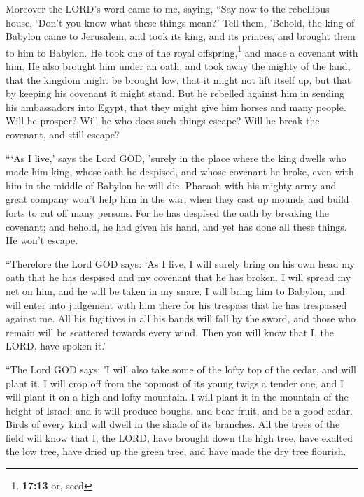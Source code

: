  Moreover the LORD's word came to me, saying,
 ``Say now to the rebellious house, `Don't you know what
these things mean?' Tell them, 'Behold, the king of Babylon came to
Jerusalem, and took its king, and its princes, and brought them to him
to Babylon.  He took one of the royal
offspring,\footnote{\textbf{17:13} or, seed} and made a covenant with
him. He also brought him under an oath, and took away the mighty of the
land,  that the kingdom might be brought low, that it
might not lift itself up, but that by keeping his covenant it might
stand.  But he rebelled against him in sending his
ambassadors into Egypt, that they might give him horses and many people.
Will he prosper? Will he who does such things escape? Will he break the
covenant, and still escape?

 ```As I live,' says the Lord GOD, 'surely in the place
where the king dwells who made him king, whose oath he despised, and
whose covenant he broke, even with him in the middle of Babylon he will
die.  Pharaoh with his mighty army and great company
won't help him in the war, when they cast up mounds and build forts to
cut off many persons.  For he has despised the oath by
breaking the covenant; and behold, he had given his hand, and yet has
done all these things. He won't escape.

 ``Therefore the Lord GOD says: `As I live, I will surely
bring on his own head my oath that he has despised and my covenant that
he has broken.  I will spread my net on him, and he will
be taken in my snare. I will bring him to Babylon, and will enter into
judgement with him there for his trespass that he has trespassed against
me.  All his fugitives in all his bands will fall by the
sword, and those who remain will be scattered towards every wind. Then
you will know that I, the LORD, have spoken it.'

 ``The Lord GOD says: 'I will also take some of the lofty
top of the cedar, and will plant it. I will crop off from the topmost of
its young twigs a tender one, and I will plant it on a high and lofty
mountain.  I will plant it in the mountain of the height
of Israel; and it will produce boughs, and bear fruit, and be a good
cedar. Birds of every kind will dwell in the shade of its branches.
 All the trees of the field will know that I, the LORD,
have brought down the high tree, have exalted the low tree, have dried
up the green tree, and have made the dry tree flourish.

